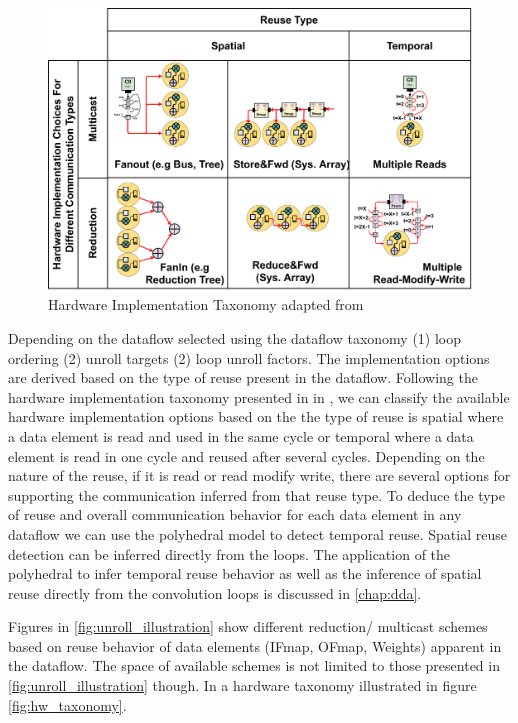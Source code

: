 \begin{figure}[ht]
    \centering
    \includegraphics[scale=0.58]{fig/hw_taxonomy.pdf}
    \caption{Hardware Implementation Taxonomy adapted from \cite{maestro}}
    \label{fig:hw_taxonomy}
\end{figure}


Depending on the dataflow selected using the dataflow taxonomy (1) loop ordering
(2) unroll targets (2) loop unroll factors. The implementation options are
derived based on the type of reuse present in the dataflow. Following the
hardware implementation taxonomy presented in in \cite{maestro}, we can classify
the available hardware implementation options based on the the type of reuse is
spatial where a data element is read and used in the same cycle or temporal
where a data element is read in one cycle and reused after several cycles.
Depending on the nature of the reuse, if it is read or read modify write, there
are several options for supporting the communication inferred from that reuse
type. To deduce the type of reuse and overall communication behavior for each
data element in any dataflow we can use the polyhedral model to detect temporal
reuse. Spatial reuse detection can be inferred directly from the loops. The
application of the polyhedral to infer temporal reuse behavior as well as the
inference of spatial reuse directly from the convolution loops is discussed in
\autoref{chap:dda}.

Figures in \autoref{fig:unroll_illustration} show different reduction/ multicast
schemes based on reuse behavior of data elements (IFmap, OFmap, Weights)
apparent in the dataflow. The space of available schemes is not limited to those
presented in \autoref{fig:unroll_illustration} though. In \cite{maestro} a
hardware taxonomy illustrated in figure \autoref{fig:hw_taxonomy}.

